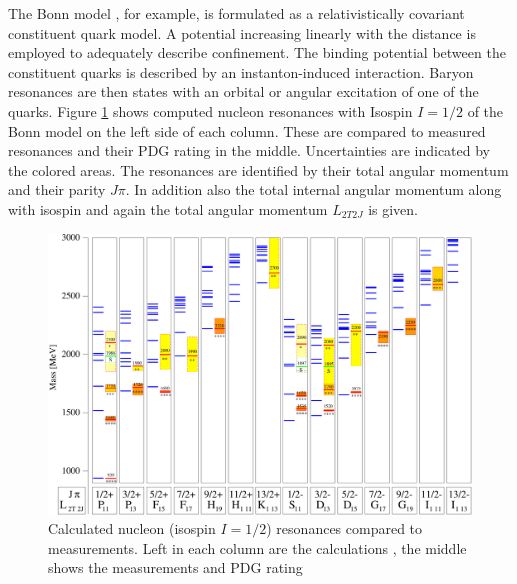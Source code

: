  The Bonn model \cite{bonnmodel}, for example, is formulated as a relativistically covariant constituent quark model.
 A potential increasing linearly with the distance is employed to adequately describe confinement. The binding potential between the constituent quarks is described by an instanton-induced interaction. Baryon resonances are then states with an orbital or angular excitation of one of the quarks. Figure \ref{fig:bm} shows computed  nucleon resonances with Isospin $I=1/2$ of the Bonn model \cite{bonnmodel} on the left side of each column. These are compared to measured resonances and their PDG rating \cite{pdg} in the middle. Uncertainties are indicated by the colored areas. The resonances are identified by their total angular momentum and their parity $J\pi$. In addition also the total internal angular momentum along with isospin and again the total angular momentum $L_{2T2J}$ is given.
  \begin{figure}[htbp]
 	\centering
 	\includegraphics[width=\linewidth]{figs/NucM2.pdf}
 	\caption{Calculated nucleon (isospin $I=1/2$) resonances compared to measurements. Left in each column are the calculations \cite{bonnmodel}, the middle shows the measurements and PDG rating \cite{pdg}}
 	\label{fig:bm}
 \end{figure}
